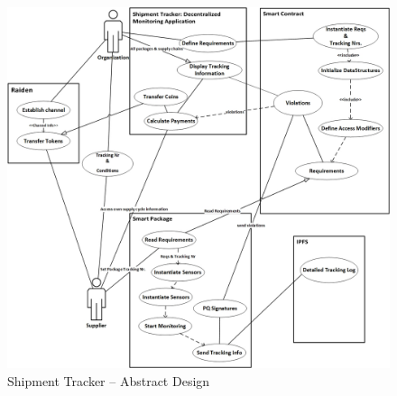 \begin{figure}[h]
	\centering
    \includegraphics[width=170mm,scale=1]{figs/Abstractdesign}
	\caption{Shipment Tracker – Abstract Design}
	\label{fig:Abstractdesign}
\end{figure}
\clearpage



 
